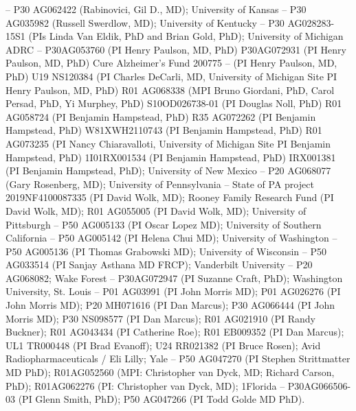 \documentclass[11pt,a4paper]{article}
\begin{document}
-- P30 AG062422 (Rabinovici, Gil D., MD); University of Kansas -- P30 AG035982
(Russell Swerdlow, MD); University of Kentucky -- P30 AG028283-15S1 (PIs Linda
Van Eldik, PhD and Brian Gold, PhD); University of Michigan ADRC -- P30AG053760
(PI Henry Paulson, MD, PhD) P30AG072931 (PI Henry Paulson, MD, PhD) Cure
Alzheimer's Fund 200775 -- (PI Henry Paulson, MD, PhD) U19 NS120384 (PI Charles
DeCarli, MD, University of Michigan Site PI Henry Paulson, MD, PhD) R01 AG068338
(MPI Bruno Giordani, PhD, Carol Persad, PhD, Yi Murphey, PhD) S10OD026738-01
(PI Douglas Noll, PhD) R01 AG058724 (PI Benjamin Hampstead, PhD) R35 AG072262
(PI Benjamin Hampstead, PhD) W81XWH2110743 (PI Benjamin Hampstead, PhD) R01
AG073235 (PI Nancy Chiaravalloti, University of Michigan Site PI Benjamin
Hampstead, PhD) 1I01RX001534 (PI Benjamin Hampstead, PhD) IRX001381 (PI Benjamin
Hampstead, PhD); University of New Mexico -- P20 AG068077 (Gary Rosenberg, MD);
University of Pennsylvania -- State of PA project 2019NF4100087335 (PI David
Wolk, MD); Rooney Family Research Fund (PI David Wolk, MD); R01 AG055005 (PI
David Wolk, MD); University of Pittsburgh -- P50 AG005133 (PI Oscar Lopez MD);
University of Southern California -- P50 AG005142 (PI Helena Chui MD); University
of Washington -- P50 AG005136 (PI Thomas Grabowski MD); University of Wisconsin
-- P50 AG033514 (PI Sanjay Asthana MD FRCP); Vanderbilt University -- P20
AG068082; Wake Forest -- P30AG072947 (PI Suzanne Craft, PhD); Washington
University, St. Louis -- P01 AG03991 (PI John Morris MD); P01 AG026276 (PI John
Morris MD); P20 MH071616 (PI Dan Marcus); P30 AG066444 (PI John Morris MD);
P30 NS098577 (PI Dan Marcus); R01 AG021910 (PI Randy Buckner); R01 AG043434
(PI Catherine Roe); R01 EB009352 (PI Dan Marcus); UL1 TR000448 (PI Brad
Evanoff); U24 RR021382 (PI Bruce Rosen); Avid Radiopharmaceuticals / Eli Lilly;
Yale -- P50 AG047270 (PI Stephen Strittmatter MD PhD); R01AG052560 (MPI:
Christopher van Dyck, MD; Richard Carson, PhD); R01AG062276 (PI: Christopher
van Dyck, MD); 1Florida -- P30AG066506-03 (PI Glenn Smith, PhD); P50 AG047266
(PI Todd Golde MD PhD).



\end{document}
